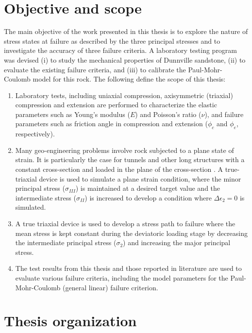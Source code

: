 \section{Objective and scope}

The main objective of the work presented in this thesis is to explore the nature of stress states at failure as described by the three principal stresses and to investigate the accuracy of three failure criteria. A laboratory testing program was devised (i) to study the mechanical properties of Dunnville sandstone, (ii) to evaluate the existing failure criteria, and (iii) to calibrate the Paul-Mohr-Coulomb model for this rock. The following define the scope of this thesis:

\begin{enumerate}
    \item Laboratory tests, including uniaxial compression, axisymmetric (triaxial) compression and extension are performed to characterize the elastic parameters such as Young's modulus ($E$) and Poisson’s ratio ($\nu$), and failure parameters such as friction angle in compression and extension ($\phi_c$ and $\phi_e$, respectively).

    \item Many geo-engineering problems involve rock subjected to a plane state of strain. It is particularly the case for tunnels and other long structures with a constant cross-section and loaded in the plane of the cross-section \cite{Jaeger1979}. A true-triaxial device is used to simulate a plane strain condition, where the minor principal stress ($\sigma_{III}$) is maintained at a desired target value and the intermediate stress ($\sigma_{II}$) is increased to develop a condition where $\Delta\epsilon_2=0$ is simulated.

    \item A true triaxial device is used to develop a stress path to failure where the mean stress is kept constant during the deviatoric loading stage by decreasing the intermediate principal stress ($\sigma_2$) and increasing the major principal stress.

    \item The test results from this thesis and those reported in literature are used to evaluate various failure criteria, including the model parameters for the Paul-Mohr-Coulomb (general linear) failure criterion.
\end{enumerate}

\section{Thesis organization}

